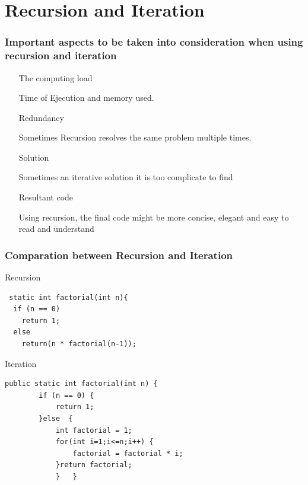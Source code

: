 \documentclass[11pt]{beamer}
\begin{document}
\section{Recursion and Iteration}
\begin{frame}
\frametitle{Important aspects to be taken into consideration when using recursion and iteration}
\begin{itemize}
\item [The computing load] 
\begin{description}
Time of Ejecution and memory used.
\end{description}
\item [Redundancy]
\begin{description}
Sometimes Recursion resolves the same problem multiple times.
\end{description}
\item [Solution]
\begin{description}
Sometimes an iterative solution it is too complicate to find
\end{description}
\item [Resultant code]
\begin{description}
Using recursion, the final code might be more concise, elegant and easy to read and understand
\end{description}
\end{itemize}

\end{frame}
\begin{frame}[fragile]
\frametitle{Comparation between Recursion and Iteration}
Recursion
\begin{verbatim}
 static int factorial(int n){    
  if (n == 0)    
    return 1;    				
  else    
    return(n * factorial(n-1));	
\end{verbatim}
\end{frame}
\begin{frame}[fragile]
Iteration
\begin{verbatim}
public static int factorial(int n) {
		if (n == 0) {
			return 1;
		}else  {
			int factorial = 1;
			for(int i=1;i<=n;i++) {
				factorial = factorial * i;	
			}return factorial;
			}	}
\end{verbatim}

\end{frame}
\end{document}
